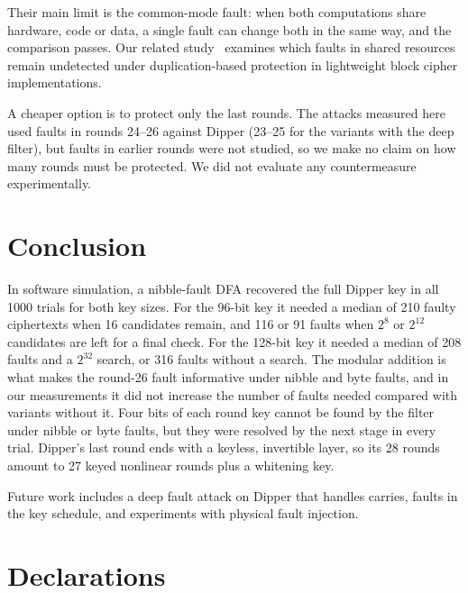 \documentclass[pdflatex,sn-mathphys-num]{sn-jnl}
\theoremstyle{thmstyleone}%
\theoremstyle{thmstylethree}%
\begin{document}
Their main limit is the common-mode fault: when both computations share hardware, code or data, a single fault
can change both in the same way, and the comparison passes. Our related study~\cite{Huseynli2027} examines which
faults in shared resources remain undetected under duplication-based protection in lightweight block cipher
implementations.

A cheaper option is to protect only the last rounds. The attacks measured here used faults in rounds 24--26
against Dipper (23--25 for the variants with the deep filter), but faults in earlier rounds were not studied, so
we make no claim on how many rounds must be protected. We did not evaluate any countermeasure experimentally.

\section{Conclusion}\label{sec:conclusion}

In software simulation, a nibble-fault DFA recovered the full Dipper key in all 1000 trials for both key sizes.
For the 96-bit key it needed a median of 210 faulty ciphertexts when 16 candidates remain, and 116 or 91 faults
when $2^{8}$ or $2^{12}$ candidates are left for a final check. For the 128-bit key it needed a median of 208 faults
and a $2^{32}$ search, or 316 faults without a search. The modular addition is what makes the round-26 fault
informative under nibble and byte faults, and in our measurements it did not increase the number of faults needed
compared with variants without it. Four bits of each round key cannot be found by the filter under nibble or byte
faults, but they were resolved by the next stage in every trial. Dipper's last round ends with a keyless, invertible
layer, so its 28 rounds amount to 27 keyed nonlinear rounds plus a whitening key.

Future work includes a deep fault attack on Dipper that handles carries, faults in the key schedule, and
experiments with physical fault injection.

\backmatter


\section*{Declarations}
\end{document}
